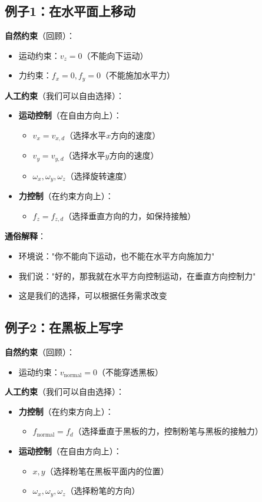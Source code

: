 \documentclass[12pt,a4paper]{article}
\begin{document}
\subsection{例子1：在水平面上移动}

\textbf{自然约束}（回顾）：
\begin{itemize}
\item 运动约束：$v_z = 0$（不能向下运动）
\item 力约束：$f_x = 0, f_y = 0$（不能施加水平力）
\end{itemize}

\textbf{人工约束}（我们可以自由选择）：
\begin{itemize}
\item \textbf{运动控制}（在自由方向上）：
\begin{itemize}
\item $v_x = v_{x,d}$（选择水平$x$方向的速度）
\item $v_y = v_{y,d}$（选择水平$y$方向的速度）
\item $\omega_x, \omega_y, \omega_z$（选择旋转速度）
\end{itemize}
\item \textbf{力控制}（在约束方向上）：
\begin{itemize}
\item $f_z = f_{z,d}$（选择垂直方向的力，如保持接触）
\end{itemize}
\end{itemize}

\textbf{通俗解释}：
\begin{itemize}
\item 环境说："你不能向下运动，也不能在水平方向施加力"
\item 我们说："好的，那我就在水平方向控制运动，在垂直方向控制力"
\item 这是我们的选择，可以根据任务需求改变
\end{itemize}

\subsection{例子2：在黑板上写字}

\textbf{自然约束}（回顾）：
\begin{itemize}
\item 运动约束：$v_{\text{normal}} = 0$（不能穿透黑板）
\end{itemize}

\textbf{人工约束}（我们可以自由选择）：
\begin{itemize}
\item \textbf{力控制}（在约束方向上）：
\begin{itemize}
\item $f_{\text{normal}} = f_d$（选择垂直于黑板的力，控制粉笔与黑板的接触力）
\end{itemize}
\item \textbf{运动控制}（在自由方向上）：
\begin{itemize}
\item $x, y$（选择粉笔在黑板平面内的位置）
\item $\omega_x, \omega_y, \omega_z$（选择粉笔的方向）
\end{itemize}
\end{itemize}
\end{document}

